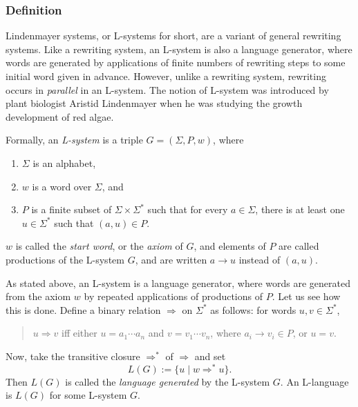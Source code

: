 \documentclass[12pt]{article}
\begin{document}
\subsubsection*{Definition}

Lindenmayer systems, or L-systems for short, are a variant of general rewriting systems.  Like a rewriting system, an L-system is also a language generator, where words are generated by applications of finite numbers of rewriting steps to some initial word given in advance.  However, unlike a rewriting system, rewriting occurs in \emph{parallel} in an L-system.  The notion of L-system was introduced by plant biologist Aristid Lindenmayer when he was studying the growth development of red algae.

Formally, an \emph{L-system} is a triple $G=(\Sigma,P,w)$, where 
\begin{enumerate}
\item $\Sigma$ is an alphabet, 
\item $w$ is a word over $\Sigma$, and 
\item $P$ is a finite subset of $\Sigma\times \Sigma^*$ such that for every $a\in \Sigma$, there is at least one $u\in \Sigma^*$ such that $(a,u)\in P$.  
\end{enumerate}
$w$ is called the \emph{start word}, or the \emph{axiom} of $G$, and elements of $P$ are called productions of the L-system $G$, and are written $a\to u$ instead of $(a,u)$.

As stated above, an L-system is a language generator, where words are generated from the axiom $w$ by repeated applications of productions of $P$.  Let us see how this is done.  Define a binary relation $\Rightarrow$ on $\Sigma^*$ as follows: for words $u,v\in \Sigma^*$, 
\begin{quote}
$u\Rightarrow v$ iff either $u=a_1\cdots a_n$ and $v=v_1\cdots v_n$, where $a_i\to v_i\in P$, or $u=v$.
\end{quote}
Now, take the transitive closure $\Rightarrow^*$ of $\Rightarrow$ and set 
$$L(G):=\lbrace u\mid w\Rightarrow^* u\rbrace.$$
Then $L(G)$ is called the \emph{language generated} by the L-system $G$.  An L-language is $L(G)$ for some L-system $G$.
\end{document}

